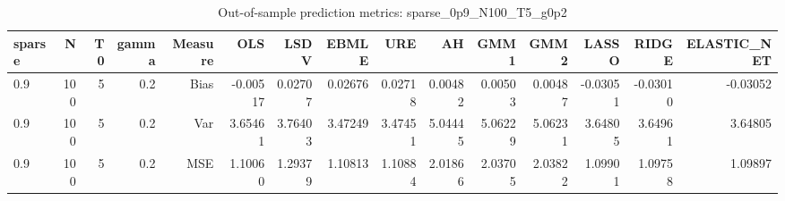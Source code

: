 \begin{table}[!htbp]\centering
\caption{Out-of-sample prediction metrics: sparse_0p9_N100_T5_g0p2}
\label{tab:table3_sparse_0p9_N100_T5_g0p2}
\begin{tabular}{lrrrrrrrrrrrrrr}
\hline
sparse & N & T0 & gamma & Measure & OLS & LSDV & EBMLE & URE & AH & GMM1 & GMM2 & LASSO & RIDGE & ELASTIC_NET \\
\hline
0.9 & 100 & 5 & 0.2 & Bias & -0.00517 & 0.02707 & 0.02676 & 0.02718 & 0.00482 & 0.00503 & 0.00487 & -0.03051 & -0.03010 & -0.03052 \\
0.9 & 100 & 5 & 0.2 & Var & 3.65461 & 3.76403 & 3.47249 & 3.47451 & 5.04445 & 5.06229 & 5.06231 & 3.64805 & 3.64961 & 3.64805 \\
0.9 & 100 & 5 & 0.2 & MSE & 1.10060 & 1.29379 & 1.10813 & 1.10884 & 2.01866 & 2.03705 & 2.03822 & 1.09901 & 1.09758 & 1.09897 \\
\hline
\end{tabular}
\end{table}

